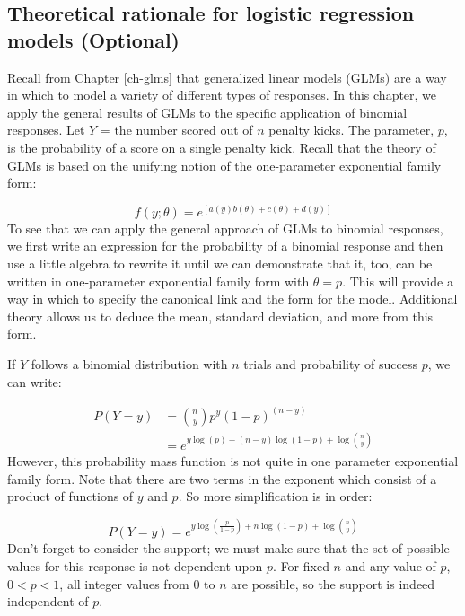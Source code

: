\documentclass[
]{krantz}
\begin{document}
\hypertarget{theoretical-rationale-for-logistic-regression-models-optional}{%
\subsection{Theoretical rationale for logistic regression models (Optional)}\label{theoretical-rationale-for-logistic-regression-models-optional}}

Recall from Chapter \ref{ch-glms} that generalized linear models (GLMs)  are a way in which to model a variety of different types of responses. In this chapter, we apply the general results of GLMs to the specific application of binomial responses. Let \(Y\) = the number scored out of \(n\) penalty kicks. The parameter, \(p\), is the probability of a score on a single penalty kick. Recall that the theory of GLMs is based on the unifying notion of the one-parameter exponential family form:

\begin{equation*}
f(y;\theta)=e^{[a(y)b(\theta)+c(\theta)+d(y)]}
\end{equation*}
To see that we can apply the general approach of GLMs  to binomial responses, we first write an expression for the probability of a binomial response and then use a little algebra to rewrite it until we can demonstrate that it, too, can be written in one-parameter exponential family form with \(\theta = p\). This will provide a way in which to specify the canonical link and the form for the model. Additional theory allows us to deduce the mean, standard deviation, and more from this form.

If \(Y\) follows a binomial distribution with \(n\) trials and probability of success \(p\), we can write:

\begin{align*}
P(Y=y)&= \binom{n}{y}p^y(1-p)^{(n-y)} \\
      &=e^{y\log(p) + (n-y)\log(1-p) + \log\binom{n}{y}}
\end{align*}
However, this probability mass function is not quite in one parameter exponential family form. Note that there are two terms in the exponent which consist of a product of functions of \(y\) and \(p\). So more simplification is in order:

\begin{equation*}
P(Y=y) = e^{y\log\left(\frac{p}{1-p}\right) + n\log(1-p)+ \log\binom{n}{y}}
\end{equation*}
Don't forget to consider the support; we must make sure that the set of possible values for this response is not dependent upon \(p\). For fixed \(n\) and any value of \(p\), \(0<p<1\), all integer values from \(0\) to \(n\) are possible, so the support is indeed independent of \(p\).
\end{document}
